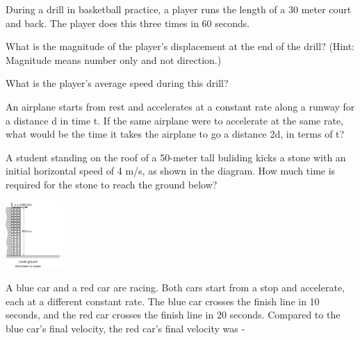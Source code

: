 \documentclass[10pt]{examdesign}
\begin{document}
\begin{multiplechoice} [title={Multiple Choice},
	rearrange=no]
\begin{block}
During a drill in basketball practice, a player runs the length of a 30 meter court and back.  The player does this three times in 60 seconds. 

\begin{question}
	What is the magnitude of the player's displacement at the end of the drill? (Hint: Magnitude means number only and not direction.)
\end{question}


	\begin{question}
What is the player's average speed during this drill? 
\end{question}
\end{block}


	\begin{question}
An airplane starts from rest and accelerates at a constant rate along a runway for a distance d in time t.  If the same airplane were to accelerate at the same rate, what would be the time it takes the airplane to go a distance 2d, in terms of t?
\end{question}

\begin{question}
A student standing on the roof of a 50-meter tall buliding kicks a stone with an initial horizontal speed of 4 m/s, as shown in the diagram.  How much time is required for the stone to reach the ground below? 

\vspace{-1in} \hspace{2 in} \includegraphics[height=1in]{building.png}

	\end{question}

\begin{question}
	A blue car and a red car are racing.  Both cars start from a stop and accelerate, each at a different constant rate.  The blue car crosses the finish line in 10 seconds, and the red car crosses the finish line in 20 seconds.  Compared to the blue car's final velocity, the red car's final velocity was - 
\end{question}


\end{multiplechoice}
\end{document}
